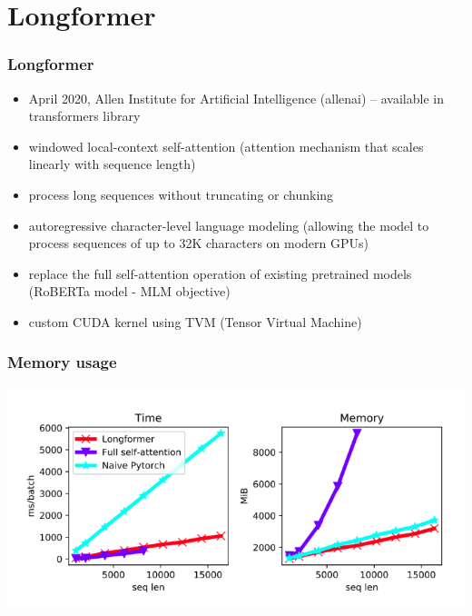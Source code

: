 \documentclass{beamer}
\begin{document}
\section{Longformer}
\begin{frame}
    \frametitle{Longformer \cite{longformer}}
    \begin{itemize}
        \item April 2020, Allen Institute for Artificial Intelligence (allenai) -- available in transformers library
        \item windowed local-context self-attention (attention mechanism that scales linearly with sequence length)
        \item process long sequences without truncating or chunking
        \item autoregressive character-level language modeling (allowing the model to process sequences of up to 32K characters on modern GPUs)
        \item replace the full self-attention operation of existing pretrained models (RoBERTa model - MLM objective)
        \item custom CUDA kernel using TVM (Tensor Virtual Machine)
    \end{itemize}
\end{frame}

\begin{frame}
    \frametitle{Memory usage}
    \begin{center}
        \includegraphics[scale=0.45]{img/longformer_seq_len_memory.png}
    \end{center}
\end{frame}
\end{document}
